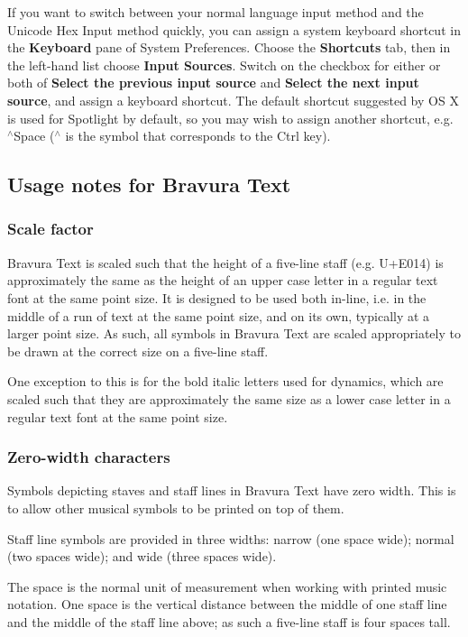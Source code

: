 If you want to switch between your normal language input method and the Unicode Hex Input method quickly, you can assign a system keyboard shortcut in the {\bfseries Keyboard} pane of System Preferences. Choose the {\bfseries Shortcuts} tab, then in the left-\/hand list choose {\bfseries Input Sources}. Switch on the checkbox for either or both of {\bfseries Select the previous input source} and {\bfseries Select the next input source}, and assign a keyboard shortcut. The default shortcut suggested by OS X is used for Spotlight by default, so you may wish to assign another shortcut, e.\+g. {\ttfamily $^\wedge$\+Space} ({\ttfamily $^\wedge$} is the symbol that corresponds to the {\ttfamily Ctrl} key).

\subsection*{Usage notes for Bravura Text}

\subsubsection*{Scale factor}

Bravura Text is scaled such that the height of a five-\/line staff (e.\+g. U+\+E014) is approximately the same as the height of an upper case letter in a regular text font at the same point size. It is designed to be used both in-\/line, i.\+e. in the middle of a run of text at the same point size, and on its own, typically at a larger point size. As such, all symbols in Bravura Text are scaled appropriately to be drawn at the correct size on a five-\/line staff.

One exception to this is for the bold italic letters used for dynamics, which are scaled such that they are approximately the same size as a lower case letter in a regular text font at the same point size.

\subsubsection*{Zero-\/width characters}

Symbols depicting staves and staff lines in Bravura Text have zero width. This is to allow other musical symbols to be printed on top of them.

Staff line symbols are provided in three widths\+: narrow (one space wide); normal (two spaces wide); and wide (three spaces wide).

The space is the normal unit of measurement when working with printed music notation. One space is the vertical distance between the middle of one staff line and the middle of the staff line above; as such a five-\/line staff is four spaces tall.


